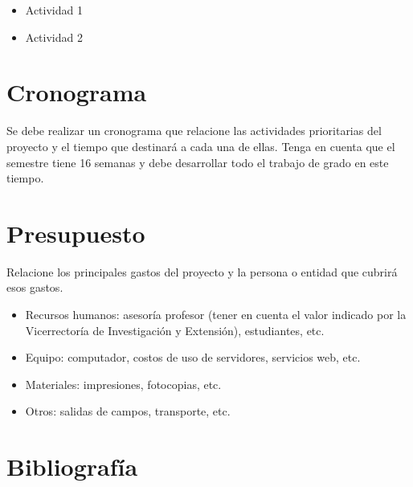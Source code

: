 \documentclass[12pt]{article}
\begin{document}
    \begin{itemize}
        \item Actividad 1
        \item Actividad 2
    \end{itemize}  

    \section{Cronograma}

    Se debe realizar un cronograma que relacione las actividades prioritarias del proyecto y el tiempo que destinará a cada una de ellas. Tenga en cuenta que el semestre tiene 16 semanas y debe desarrollar todo el trabajo de grado en este tiempo. 

    \section{Presupuesto}

    Relacione los principales gastos del proyecto y la persona o entidad que cubrirá esos gastos.

    \begin{itemize}
        
        \item Recursos humanos:  asesoría profesor (tener en cuenta el valor indicado por la Vicerrectoría de Investigación y Extensión), estudiantes, etc.
        \item Equipo:  computador, costos de uso de servidores, servicios web, etc.
        \item Materiales:  impresiones, fotocopias, etc.
        \item Otros:  salidas de campos, transporte, etc.
        
    \end{itemize}

    \pagebreak

    \section{Bibliografía}

    \begingroup
    \renewcommand{\section}[2]{}
    \renewcommand{\addcontentsline}[3]{}
    
    \endgroup
\end{document}
